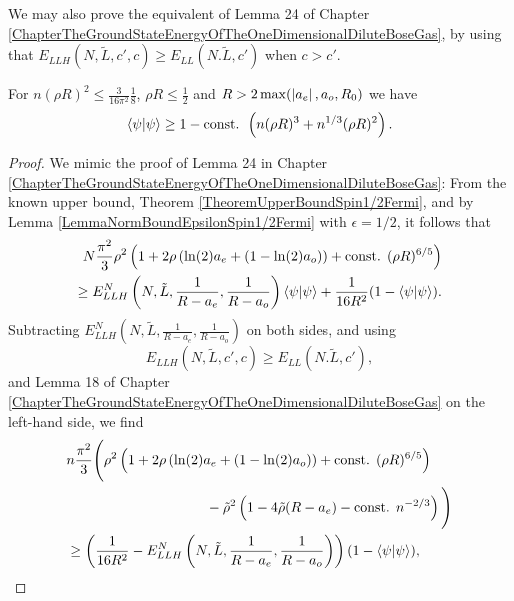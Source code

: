 We may also prove the equivalent of Lemma 24 of Chapter \ref{ChapterTheGroundStateEnergyOfTheOneDimensionalDiluteBoseGas}, by using that $ E_{LLH}(N,\tilde{L},c',c)\geq E_{LL}(N.\tilde{L},c') $ when $ c>c' $.
	\begin{lemma}\label{LemmaImprovedMassBoundSpin1/2Fermi}
	For $ n(\rho R)^2\leq  \frac{3}{16\pi^2}\frac{1}{8} $, $ \rho R\leq \frac{1}{2} $ and $ R>2\max(\left\lvert a_e \right\rvert,a_o,R_0) $ we have
	\begin{equation}\label{EqImprovedMassBoundSpin1/2Fermi}
	\begin{aligned}
	\left\langle\psi|\psi\right\rangle \geq 1-\textnormal{const. }\left(n(\rho R)^3+n^{1/3}(\rho R)^2\right).
	\end{aligned}
	\end{equation}
\end{lemma}
\begin{proof}
	We mimic the proof of Lemma 24 in Chapter \ref{ChapterTheGroundStateEnergyOfTheOneDimensionalDiluteBoseGas}: From the known upper bound, \ie Theorem \ref{TheoremUpperBoundSpin1/2Fermi}, and by Lemma \ref{LemmaNormBoundEpsilonSpin1/2Fermi} with $ \epsilon=1/2 $, it follows that 
    \begin{equation}
    \begin{aligned}
    N\frac{\pi^2}{3}\rho^2\left(1+2\rho\left( \ln(2)a_e+(1-\ln(2)a_o) \right)+\text{const. }(\rho R)^{6/5}\right)\\\geq E_{LLH}^N \left(N,\tilde{L},\frac{1}{R-a_e},\frac{1}{R-a_o}\right)\left\langle\psi|\psi\right\rangle+ \frac{1}{16R^2}(1-\left\langle\psi|\psi\right\rangle).
    \end{aligned}
    \end{equation}
	Subtracting $ E_{LLH}^N \left(N,\tilde{L},\frac{1}{R-a_e},\frac{1}{R-a_o}\right) $ on both sides, and using $$ E_{LLH}(N,\tilde{L},c',c)\geq E_{LL}(N.\tilde{L},c'), $$ and Lemma 18 of Chapter \ref{ChapterTheGroundStateEnergyOfTheOneDimensionalDiluteBoseGas} on the left-hand side, we find\begin{equation}
	\begin{aligned}
	&n\frac{\pi^2}{3}\Bigg(\rho^2\left(1+2\rho\left( \ln(2)a_e+(1-\ln(2)a_o) \right)+\text{const. }(\rho R)^{6/5}\right)\\&\qquad \qquad\qquad\qquad\qquad-\tilde{\rho}^2\left(1-4\tilde{\rho} (R-a_e)-\text{const. }n^{-2/3}\right)\Bigg)\\
	&\geq  \left(\frac{1}{16R^2}-E_{LLH}^N \left(N,\tilde{L},\frac{1}{R-a_e},\frac{1}{R-a_o}\right)\right)(1-\left\langle\psi|\psi\right\rangle),
	\end{aligned}
	\end{equation}

\end{proof}
